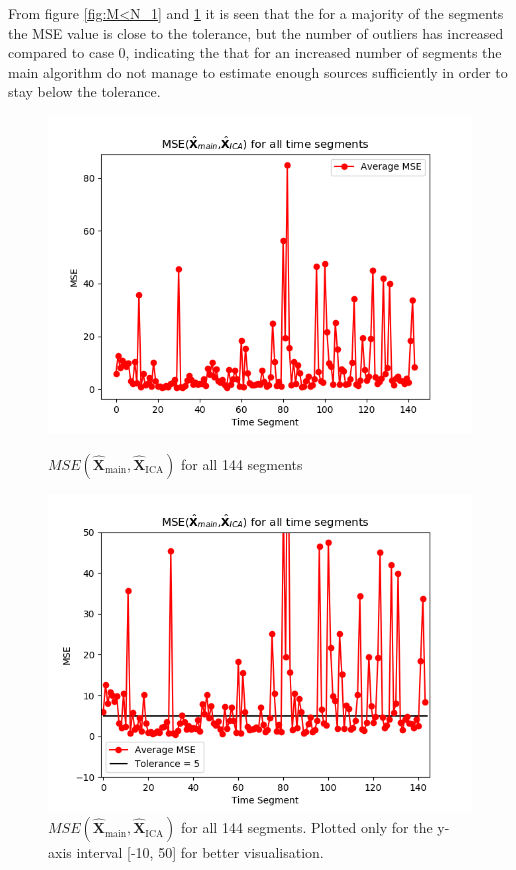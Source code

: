 From figure \ref{fig:M<N_1} and \ref{fig:M<N_1_2} it is seen that the for a majority of the segments the MSE value is close to the tolerance, but the number of outliers has increased compared to case 0, indicating the that for an increased number of segments the main algorithm do not manage to estimate enough  sources sufficiently in order to stay below the tolerance.   
\begin{figure}[H]
\begin{widepage}
    \begin{minipage}[t]{.45\textwidth}
		\centering
		\includegraphics[width=1\linewidth]{figures/ch_7/average_mse_third_removed_ica}
	\caption{$MSE\left(\hat{\mathbf{X}}_{\text{main}},\hat{\mathbf{X}}_{\text{ICA}}\right)$ for all 144 segments}
	\label{fig:M<N_1}
    \end{minipage} 
\hspace{0.5cm}
    \begin{minipage}[t]{.45\textwidth}
        \centering
		\includegraphics[width=1\linewidth]{figures/ch_7/average_mse_third_removed_ica_zoom.png}
	\caption{$MSE\left(\hat{\mathbf{X}}_{\text{main}},\hat{\mathbf{X}}_{\text{ICA}}\right)$ for all 144 segments. Plotted only for the y-axis interval [-10, 50] for better visualisation.}
	\label{fig:M<N_1_2}
    \end{minipage}
\end{widepage}
\end{figure}
